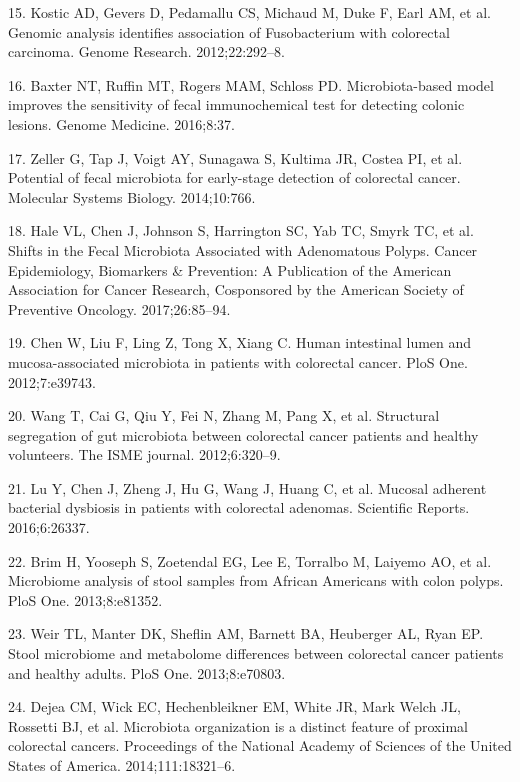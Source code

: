 \documentclass[12pt,]{article}
\begin{document}
\hypertarget{ref-kostic_genomic_2012}{}
15. Kostic AD, Gevers D, Pedamallu CS, Michaud M, Duke F, Earl AM, et
al. Genomic analysis identifies association of Fusobacterium with
colorectal carcinoma. Genome Research. 2012;22:292--8.

\hypertarget{ref-baxter_microbiota-based_2016}{}
16. Baxter NT, Ruffin MT, Rogers MAM, Schloss PD. Microbiota-based model
improves the sensitivity of fecal immunochemical test for detecting
colonic lesions. Genome Medicine. 2016;8:37.

\hypertarget{ref-zeller_potential_2014}{}
17. Zeller G, Tap J, Voigt AY, Sunagawa S, Kultima JR, Costea PI, et al.
Potential of fecal microbiota for early-stage detection of colorectal
cancer. Molecular Systems Biology. 2014;10:766.

\hypertarget{ref-hale_shifts_2017}{}
18. Hale VL, Chen J, Johnson S, Harrington SC, Yab TC, Smyrk TC, et al.
Shifts in the Fecal Microbiota Associated with Adenomatous Polyps.
Cancer Epidemiology, Biomarkers \& Prevention: A Publication of the
American Association for Cancer Research, Cosponsored by the American
Society of Preventive Oncology. 2017;26:85--94.

\hypertarget{ref-chen_human_2012}{}
19. Chen W, Liu F, Ling Z, Tong X, Xiang C. Human intestinal lumen and
mucosa-associated microbiota in patients with colorectal cancer. PloS
One. 2012;7:e39743.

\hypertarget{ref-wang_structural_2012}{}
20. Wang T, Cai G, Qiu Y, Fei N, Zhang M, Pang X, et al. Structural
segregation of gut microbiota between colorectal cancer patients and
healthy volunteers. The ISME journal. 2012;6:320--9.

\hypertarget{ref-lu_mucosal_2016}{}
21. Lu Y, Chen J, Zheng J, Hu G, Wang J, Huang C, et al. Mucosal
adherent bacterial dysbiosis in patients with colorectal adenomas.
Scientific Reports. 2016;6:26337.

\hypertarget{ref-brim_microbiome_2013}{}
22. Brim H, Yooseph S, Zoetendal EG, Lee E, Torralbo M, Laiyemo AO, et
al. Microbiome analysis of stool samples from African Americans with
colon polyps. PloS One. 2013;8:e81352.

\hypertarget{ref-weir_stool_2013}{}
23. Weir TL, Manter DK, Sheflin AM, Barnett BA, Heuberger AL, Ryan EP.
Stool microbiome and metabolome differences between colorectal cancer
patients and healthy adults. PloS One. 2013;8:e70803.

\hypertarget{ref-dejea_microbiota_2014}{}
24. Dejea CM, Wick EC, Hechenbleikner EM, White JR, Mark Welch JL,
Rossetti BJ, et al. Microbiota organization is a distinct feature of
proximal colorectal cancers. Proceedings of the National Academy of
Sciences of the United States of America. 2014;111:18321--6.
\end{document}

